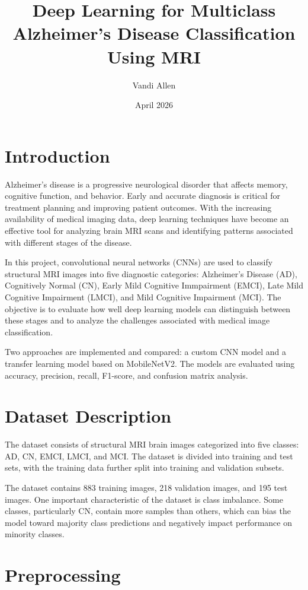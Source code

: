 \documentclass[12pt]{article}
\title{Deep Learning for Multiclass Alzheimer’s Disease Classification Using MRI}
\author{Vandi Allen}
\date{April 2026}
\begin{document}
\maketitle

\section{Introduction}

Alzheimer’s disease is a progressive neurological disorder that affects memory, cognitive function, and behavior. Early and accurate diagnosis is critical for treatment planning and improving patient outcomes. With the increasing availability of medical imaging data, deep learning techniques have become an effective tool for analyzing brain MRI scans and identifying patterns associated with different stages of the disease.

In this project, convolutional neural networks (CNNs) are used to classify structural MRI images into five diagnostic categories: Alzheimer’s Disease (AD), Cognitively Normal (CN), Early Mild Cognitive Immpairment (EMCI), Late Mild Cognitive Impairment (LMCI), and Mild Cognitive Impairment (MCI). The objective is to evaluate how well deep learning models can distinguish between these stages and to analyze the challenges associated with medical image classification.

Two approaches are implemented and compared: a custom CNN model and a transfer learning model based on MobileNetV2. The models are evaluated using accuracy, precision, recall, F1-score, and confusion matrix analysis.

\section{Dataset Description}

The dataset consists of structural MRI brain images categorized into five classes: AD, CN, EMCI, LMCI, and MCI. The dataset is divided into training and test sets, with the training data further split into training and validation subsets.

The dataset contains 883 training images, 218 validation images, and 195 test images. One important characteristic of the dataset is class imbalance. Some classes, particularly CN, contain more samples than others, which can bias the model toward majority class predictions and negatively impact performance on minority classes.

\section{Preprocessing}
\end{document}
